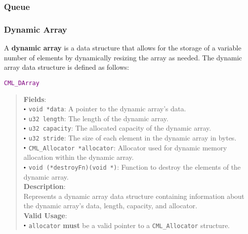 \documentclass[a4paper,oneside,8pt]{extarticle}
\newcommand{\struct}[1]{
  \noindent\textcolor{purple}{\texttt{#1}}
  \vspace{-0.3em}
}
\renewcommand{\dot}{\raisebox{0.3ex}{\scalebox{0.6}{$\bullet$}}}
\theoremstyle{definition}
\begin{document}
\subsubsection{Queue}

\subsubsection{Dynamic Array}

A \textbf{dynamic array} is a data structure that allows for the storage of a variable number of elements by dynamically resizing the array as needed. The dynamic array data structure is defined as follows: \newline

\struct{CML\_DArray}
\begin{quote}
  \textbf{Fields}: \\
  $\dot$ \texttt{void *data}: A pointer to the dynamic array's data. \\
  $\dot$ \texttt{u32 length}: The length of the dynamic array. \\
  $\dot$ \texttt{u32 capacity}: The allocated capacity of the dynamic array. \\
  $\dot$ \texttt{u32 stride}: The size of each element in the dynamic array in bytes. \\
  $\dot$ \texttt{CML\_Allocator *allocator}: Allocator used for dynamic memory allocation within the dynamic array. \\
  $\dot$ \texttt{void (*destroyFn)(void *)}: Function to destroy the elements of the dynamic array. \\
  
  \vspace{-0.75em}
  \textbf{Description}: \\
  Represents a dynamic array data structure containing information about the dynamic array's data, length, capacity, and allocator. \\

  \vspace{-0.75em}
  \textbf{Valid Usage}: \\
  $\dot$ \texttt{allocator} \textbf{must} be a valid pointer to a \texttt{CML\_Allocator} structure. \\
\end{quote}
\end{document}
